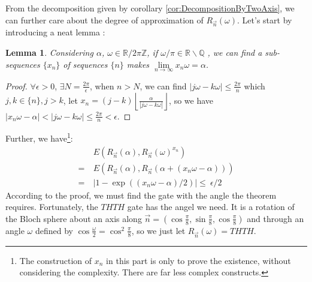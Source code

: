 \documentclass[a4paper,10pt]{book}
\newtheorem{lemma}{Lemma}[section]
\numberwithin{equation}{section}
\begin{document}
From the decomposition given by corollary \ref{cor:DecompositionByTwoAxis}, we can further care about the degree of approximation of $R_{\vec{n}}(\omega)$. Let's start by introducing a neat lemma :
\begin{lemma}\label{AngleCoverR}
    Considering $\alpha$, $\omega \in \mathbb{R} /2\pi\mathbb{Z}$, if $\omega/\pi \in \mathbb{R} \backslash \mathbb{Q}$ , we can find a sub-sequences $\{x_n\}$ of sequences $\{n\}$ makes $\lim\limits_{n\to\infty}x_n\omega = \alpha$.
\end{lemma}
\begin{proof}
    $\forall \epsilon>0$, $\exists N=\frac{2\pi}{\epsilon}$, when $n>N$, we can find $|j\omega-k\omega|\leq\frac{2\pi}{n}$ which $j,k \in \{n\},j>k$, let $x_{n} = (j-k)\left\lfloor\frac{\alpha}{|j\omega-k\omega|}\right\rfloor$, so we have $|x_{n}\omega-\alpha|<|j\omega-k\omega|\leq\frac{2\pi}{n}<\epsilon$.
\end{proof}
Further, we have\footnote{The construction of $x_{n}$ in this part is only to prove the existence, without considering the complexity. There are far less complex constructs.}:
\begin{equation}
    \begin{split}
          & \ E(R_{\vec{n}}(\alpha),R_{\vec{n}}(\omega)^{x_{n}})              \\
        = & \ E(R_{\vec{n}}(\alpha),R_{\vec{n}}(\alpha+(x_{n}\omega-\alpha))) \\
        = & \ |1-\exp((x_{n}\omega-\alpha)/2)|\leq\ \epsilon/2
    \end{split}
\end{equation}
According to the proof, we must find the gate with the angle the theorem requires. Fortunately, the $THTH$ gate has the angel we need. It is a rotation of the Bloch sphere about an axis along $\vec{n} = (\cos\frac{\pi}{8},\sin\frac{\pi}{8},\cos\frac{\pi}{8})$ and through an angle $\omega$ defined by $\cos\frac{\omega}{2} = \cos^{2}\frac{\pi}{8}$, so we just let $R_{\vec{n}}(\omega) = THTH$.
\end{document}
